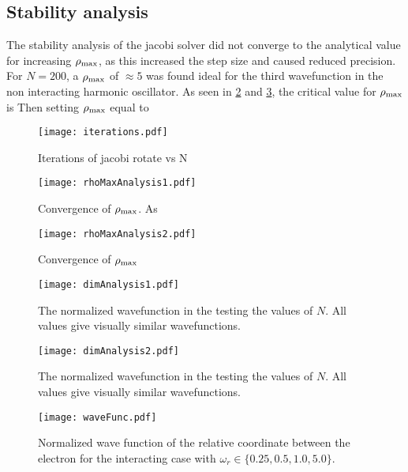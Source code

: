 \subsection{Stability analysis}
\label{sub:a_}

The stability analysis of the jacobi solver did not converge to the
analytical value for increasing $\rho_{\text{max}}$, as this increased the step size
and caused reduced precision. For $N=200$, a $\rho_{\text{max}}$ of $\approx 5$ was
found ideal for the third wavefunction in the non interacting harmonic
oscillator. As seen in \cref{fig:rhoMax1} and \ref{fig:rhoMax2}, the
critical value for $\rho_{\text{max}}$ is  Then setting $\rho_{\text{max}}$ equal to 



\begin{figure}[H]
    \centering
    \texttt{[image: iterations.pdf]}
    \caption{Iterations of jacobi rotate vs N}
    \label{fig:iterations}
\end{figure}

\begin{figure}[H]
    \centering
    \texttt{[image: rhoMaxAnalysis1.pdf]}
    \caption{Convergence of $\rho_{\text{max}}$. As}
    \label{fig:rhoMax1}
\end{figure}

\begin{figure}[H]
    \centering
    \texttt{[image: rhoMaxAnalysis2.pdf]}
    \caption{Convergence of $\rho_{\text{max}}$ }
    \label{fig:rhoMax2}
\end{figure}

\begin{figure}[H]
    \centering
    \texttt{[image: dimAnalysis1.pdf]}
    \caption{The normalized wavefunction in the testing the values of $N$.
    All values give visually similar wavefunctions.}
    \label{fig:dim1}
\end{figure}

\begin{figure}[H]
    \centering
    \texttt{[image: dimAnalysis2.pdf]}
    \caption{The normalized wavefunction in the testing the values of $N$.
    All values give visually similar wavefunctions.}
    \label{fig:dim2}
\end{figure}

\begin{figure}[H]
    \centering
    \texttt{[image: waveFunc.pdf]}
    \caption{Normalized wave function of the relative coordinate between
        the electron for the interacting case with $\omega_r \in\{0.25,
    0.5, 1.0, 5.0\}$.}
    \label{fig:waveFunc}
\end{figure}



